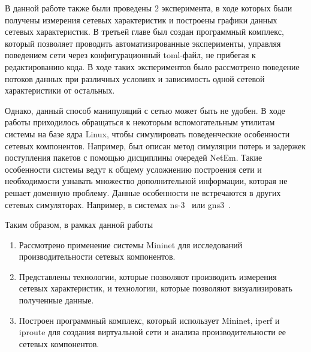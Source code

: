 В данной работе также были проведены 2 эксперимента, в ходе которых были
получены измерения сетевых характеристик и построены графики данных
сетевых характеристик. В третьей главе был создан программный комплекс,
который позволяет проводить автоматизированные эксперименты, управляя
поведением сети через конфигурационный toml-файл, не прибегая к
редактированию кода. В ходе таких экспериментов было рассмотрено
поведение потоков данных при различных условиях и зависимость одной
сетевой характеристики от остальных.

Однако, данный способ манипуляций с сетью может быть не удобен. В ходе
работы приходилось обращаться к некоторым вспомогательным утилитам
системы на базе ядра Linux, чтобы симулировать поведенческие
особенности сетевых компонентов. Например, был описан метод симуляции
потерь и задержек поступления пакетов с помощью дисциплины очередей
NetEm. Такие особенности системы ведут к общему усложнению построения
сети и необходимости узнавать множество дополнительной информации,
которая не решает доменную проблему. Данные особенности не встречаются
в других сетевых симуляторах. Например, в системах ns-3~\cite{ns3} или
gns3~\cite{gns3}.

Таким образом, в рамках данной работы
\begin{enumerate}
\item Рассмотрено применение системы Mininet для исследований
  производительности сетевых компонентов.
\item Представлены технологии, которые позволяют производить измерения
  сетевых характеристик, и технологии, которые позволяют
  визуализировать полученные данные.
\item Построен программный комплекс, который использует Mininet, iperf
  и iproute для создания виртуальной сети и анализа производительности
  ее сетевых компонентов.
\end{enumerate}

